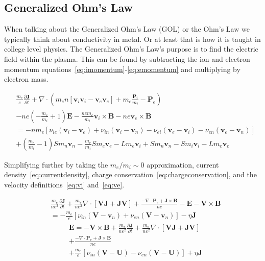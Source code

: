 \documentclass[12pt,upcase]{umlthesis}
\begin{document}
\subsection{Generalized Ohm's Law}\label{sec:ohmslaw}

When talking about the Generalized Ohm's Law (GOL) or the Ohm's Law we typically think about conductivity in metal. Or at least that is how it is taught in college level physics. The Generalized Ohm's Law's purpose is to find the electric field within the plasma. This can be found by subtracting the ion and electron momentum equations~\ref{eq:imomentum}-\ref{eq:emomentum} and multiplying by electron mass.

\begin{equation}
\begin{aligned}
	&\frac{m_e}{e}\frac{\partial \textbf{J}}{\partial t} + \nabla \cdot (m_e n [\textbf{v}_i \textbf{v}_i - \textbf{v}_e \textbf{v}_e] +m_e \frac{\textbf{P}_i}{m_i} - \textbf{P}_e) \\
	& - n e (-\frac{m_e}{m_i}+1) \textbf{E} - \frac{n e m_e}{m_i} \textbf{v}_i \times \textbf{B} - n e\textbf{v}_e \times \textbf{B} \\
	&= -n m_e [ \nu_{ie} (\textbf{v}_i -\textbf{v}_e) + \nu_{in} (\textbf{v}_i -\textbf{v}_n) - \nu_{ei} (\textbf{v}_e -\textbf{v}_i) - \nu_{en} (\textbf{v}_e -\textbf{v}_n)] \\
	&+ (\frac{m_e}{m_i} - 1) S m_n \textbf{v}_n - \frac{m_e}{m_i} S m_e \textbf{v}_e - L m_e \textbf{v}_i + S m_n \textbf{v}_n - S m_i \textbf{v}_i - L m_e \textbf{v}_e
\end{aligned}
\end{equation}

Simplifying further by taking the $m_e/m_i \sim 0$ approximation, current density~\ref{eq:currentdensity}, charge conservation~\ref{eq:chargeconservation}, and the velocity definitions~\ref{eq:vi} and~\ref{eq:ve}.

\begin{equation}
\begin{aligned}
	&\frac{m_e}{n e^2} \frac{\partial\textbf{J}}{\partial t}+ \frac{m_e}{ne^2} \nabla\cdot[\textbf{V}\textbf{J} + \textbf{J}\textbf{V}] + \frac{-\nabla\cdot\textbf{P}_e + \textbf{J}\times\textbf{B}}{ne}- \textbf{E} - \textbf{V}\times\textbf{B} \\
	& = - \frac{m_e}{e}[\nu_{in} (\textbf{V}-\textbf{v}_n) + \nu_{en}(\textbf{V} - \textbf{v}_n)] - \eta\textbf{J}
\end{aligned}
\end{equation}
\begin{equation}\label{eq:gom}
\begin{aligned}
	&\textbf{E}  = - \textbf{V}\times\textbf{B} + \frac{m_e}{n e^2} \frac{\partial\textbf{J}}{\partial t}+ \frac{m_e}{ne^2} \nabla\cdot[\textbf{V}\textbf{J} + \textbf{J}\textbf{V}] \\
	&+ \frac{-\nabla\cdot\textbf{P}_e + \textbf{J}\times\textbf{B}}{ne} \\
	&  + \frac{m_e}{e}[\nu_{in} (\textbf{V}-\textbf{U}) - \nu_{en}(\textbf{V} - \textbf{U})] + \eta\textbf{J}
\end{aligned}
\end{equation}
\end{document}
